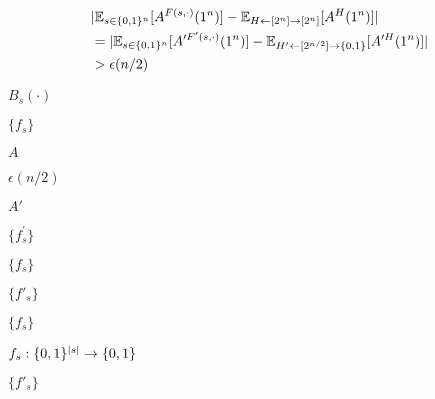 \documentclass[10pt]{book}
\begin{document}
\begin{mdSnippets}
\begin{mdDisplaySnippet}[86b26f89eea39c4323b7489fa011ec0d]
\[\begin{aligned}
&|\mathbb{E}_{s\in\{0,1\}^n}[A^{F(s,\cdot)}(1^n)] - \mathbb{E}_{H \gets [2^n] \to [2^n]}[A^{H}(1^n)]|\\
&= |\mathbb{E}_{s \in \{0,1\}^n}[A'^{F'(s,\cdot)}(1^n)] - \mathbb{E}_{H' \gets [2^{n/2}] \to \{0,1\}}[A'^{H}(1^n)]| \\
&> \epsilon(n/2)
\end{aligned}
\]%
\end{mdDisplaySnippet}%
\begin{mdInlineSnippet}[845fe607884452a94e0eb68e732c447b]%
$B_s(\cdot)$\end{mdInlineSnippet}%
\begin{mdInlineSnippet}[f0a0745b39ca7c74b201f7784e766521]%
$\{f_s\}$\end{mdInlineSnippet}%
\begin{mdInlineSnippet}[7fc56270e7a70fa81a5935b72eacbe29]%
$A$\end{mdInlineSnippet}%
\begin{mdInlineSnippet}[1e746f6ba10fd5c2b4c68c6fcf735c18]%
$\epsilon(n/2)$\end{mdInlineSnippet}%
\begin{mdInlineSnippet}[37a12b78a9ca96989ad7ceceacb37ea2]%
$A'$\end{mdInlineSnippet}%
\begin{mdInlineSnippet}%
$\{f_s^{\prime}\}$\end{mdInlineSnippet}%
\begin{mdInlineSnippet}[f0a0745b39ca7c74b201f7784e766521]%
$\{f_s\}$\end{mdInlineSnippet}%
\begin{mdInlineSnippet}[89b60561e79aafb687cb0d21405683aa]%
$\{f'_s\}$\end{mdInlineSnippet}%
\begin{mdInlineSnippet}[37a2ce8e5337ae1139e64a8ff1f2f6bb]%
$\{ f_s \}$\end{mdInlineSnippet}%
\begin{mdInlineSnippet}%
$f_s:\{0,1\}^{|s|}\rightarrow \{0,1\}$\end{mdInlineSnippet}%
\begin{mdInlineSnippet}[d2a9c8322690fce87499dd560ac2f432]%
$\{ f'_s \}$\end{mdInlineSnippet}%

\end{mdSnippets}
\end{document}
